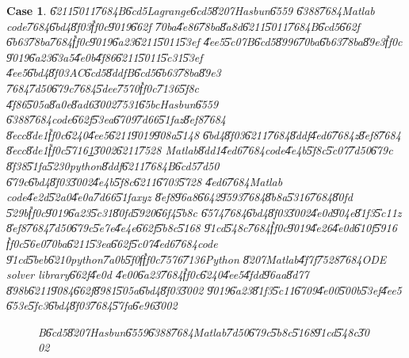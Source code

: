 \documentclass[12pt,a4paper]{article}
\newtheorem{case}[theorem]{Case}
\begin{document}
\begin{case}
\U{6211}\U{5011}\U{7684}B\U{6cd5}Lagrange\U{6cd5}\U{8207}Hasbun\U{6559}%
\U{6388}\U{7684}Matlab code\U{7684}\U{6bd4}\U{8f03}\U{ff0c}\U{9019}\U{662f}%
\U{70ba}\U{4e86}\U{78ba}\U{8a8d}\U{6211}\U{5011}\U{7684}B\U{6cd5}\U{662f}%
\U{6b63}\U{78ba}\U{7684}\U{ff0c}\U{9019}\U{6a23}\U{6211}\U{5011}\U{53ef}%
\U{4ee5}\U{5c07}B\U{6cd5}\U{8996}\U{70ba}\U{6b63}\U{78ba}\U{89e3}\U{ff0c}%
\U{9019}\U{6a23}\U{63a5}\U{4e0b}\U{4f86}\U{6211}\U{5011}\U{5c31}\U{53ef}%
\U{4ee5}\U{6bd4}\U{8f03}AC\U{6cd5}\U{8ddf}B\U{6cd5}\U{6b63}\U{78ba}\U{89e3}%
\U{7684}\U{7d50}\U{679c}\U{7684}\U{5dee}\U{7570}\U{ff0c}\U{7136}\U{5f8c}%
\U{4f86}\U{505a}\U{8a0e}\U{8ad6}\U{3002}\U{7531}\U{65bc}Hasbun\U{6559}%
\U{6388}\U{7684}code\U{662f}\U{53ea}\U{6709}\U{7d66}\U{51fa}z\U{8ef8}\U{7684}%
\U{8ecc}\U{8de1}\U{ff0c}\U{6240}\U{4ee5}\U{6211}\U{9019}\U{908a}\U{5148}%
\U{6bd4}\U{8f03}\U{6211}\U{7684}\U{8ddf}\U{4ed6}\U{7684}z\U{8ef8}\U{7684}%
\U{8ecc}\U{8de1}\U{ff0c}\U{5716}\ref{BandHasbun}\U{3002}\U{6211}\U{7528}%
Matlab\U{8dd1}\U{4ed6}\U{7684}code\U{4e4b}\U{5f8c}\U{5c07}\U{7d50}\U{679c}%
\U{8f38}\U{51fa}\U{5230}python\U{8ddf}\U{6211}\U{7684}B\U{6cd5}\U{7d50}%
\U{679c}\U{6bd4}\U{8f03}\U{3002}\U{4e4b}\U{5f8c}\U{6211}\U{6703}\U{5728}%
\U{4ed6}\U{7684}Matlab code\U{4e2d}\U{52a0}\U{4e0a}\U{7d66}\U{51fa}xyz%
\U{8ef8}\U{96a8}\U{6642}\U{9593}\U{7684}\U{8b8a}\U{5316}\U{7684}\U{80fd}%
\U{529b}\U{ff0c}\U{9019}\U{6a23}\U{5c31}\U{80fd}\U{5920}\U{66f4}\U{5b8c}%
\U{6574}\U{7684}\U{6bd4}\U{8f03}\U{3002}\U{4e0d}\U{904e}\U{81f3}\U{5c11}z%
\U{8ef8}\U{7684}\U{7d50}\U{679c}\U{5e7e}\U{4e4e}\U{662f}\U{5b8c}\U{5168}%
\U{91cd}\U{548c}\U{7684}\U{ff0c}\U{9019}\U{4e26}\U{4e0d}\U{610f}\U{5916}%
\U{ff0c}\U{56e0}\U{70ba}\U{6211}\U{53ea}\U{662f}\U{5c07}\U{4ed6}\U{7684}code%
\U{91cd}\U{5beb}\U{6210}python\U{7a0b}\U{5f0f}\U{ff0c}\U{7576}\U{7136}Python%
\U{8207}Matlab\U{4f7f}\U{7528}\U{7684}ODE solver library\U{662f}\U{4e0d}%
\U{4e00}\U{6a23}\U{7684}\U{ff0c}\U{6240}\U{4ee5}\U{4fdd}\U{96aa}\U{8d77}%
\U{898b}\U{6211}\U{9084}\U{662f}\U{8981}\U{505a}\U{6bd4}\U{8f03}\U{3002}%
\U{9019}\U{6a23}\U{81f3}\U{5c11}\U{6709}\U{4e00}\U{500b}\U{53ef}\U{4ee5}%
\U{653e}\U{5fc3}\U{6bd4}\U{8f03}\U{7684}\U{57fa}\U{6e96}\U{3002}%
\begin{figure}
[th]
\caption{B\U{6cd5}\U{8207}Hasbun\U{6559}\U{6388}\U{7684}Matlab\U{7d50}\U{679c}\U{5b8c}\U{5168}\U{91cd}\U{548c}\U{3002}}
\label{BandHasbun}
\begin{center}
\end{center}
\end{figure}%
\end{case}
\end{document}
